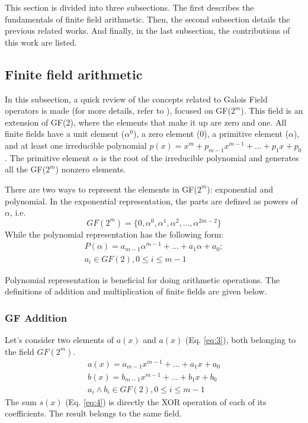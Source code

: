 This section is divided into three subsections. The first describes the fundamentals of finite field arithmetic. 
Then, the second subsection details the previous related works. And finally, in the last subsection, 
the contributions of this work are listed.

\subsection{Finite field arithmetic}

In this subsection, a quick review of the concepts related to Galois Field operators is made (for more details, refer to \cite{deschamps2009hardware}), 
focused on GF($2^m$). This field is an extension of GF(2), where the elements that make it up are zero and one. 
All finite fields have a unit element ($\alpha^0$), a zero element ($0$), a primitive element ($\alpha$), and at least one irreducible polynomial 
$p(x) = x^m + p_{m-1}x^{m-1} + ... + p_{1}x + p_{0}$. The primitive element $\alpha$ is the root of the irreducible polynomial and 
generates all the GF($2^m$) nonzero elements.


There are two ways to represent the elements in GF($2^m$): exponential and polynomial. 
In the exponential representation, the parts are defined as powers of $\alpha$, i.e.
\begin{equation}
 GF (2^m) = \{ 0, \alpha^0, \alpha^1, \alpha^2, ..., \alpha^{2m-2}  \}
 \label{eq:1}
\end{equation}
While the polynomial representation has the following form:
\begin{equation}
\begin{split}
 P(\alpha) = a_{m-1}\alpha^{m-1} + ... + a_{1}\alpha + a_{0};\\ 
 a_{i} \in GF(2), 0 \leq i \leq m-1
 \end{split}
 \label{eq:2}
\end{equation}


Polynomial representation is beneficial for doing arithmetic operations. %
The definitions of addition and multiplication of finite fields are given below.


\subsubsection{GF Addition}
Let's consider two elements of $a(x)$ and $a(x)$ (Eq. \ref{eq:3}), both belonging to the field $GF(2^m)$.
\begin{equation}
\begin{split}
 a(x) = a_{m-1}x^{m-1} + ... + a_{1}x + a_{0}\\
 b(x) = b_{m-1}x^{m-1} + ... + b_{1}x + b_{0}\\
 a_{i} \wedge b_{i} \in GF(2), 0 \leq i \leq m-1
 \end{split}
 \label{eq:3}
\end{equation}
The sum $s(x)$ (Eq. \ref{eq:4}) is directly the XOR operation of each of its coefficients. The result belongs to the same field.

